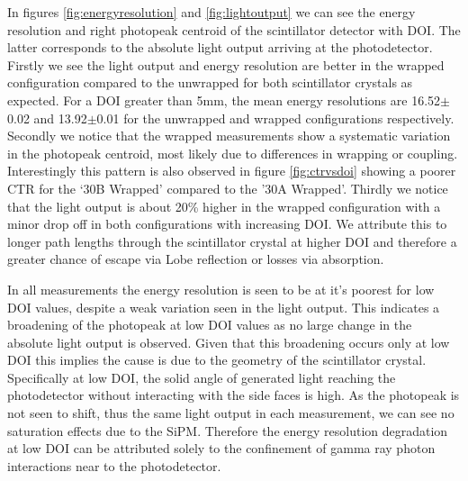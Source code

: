 In figures \ref{fig:energyresolution} and \ref{fig:lightoutput} we can see the energy resolution and right photopeak centroid of the scintillator detector with DOI. The latter corresponds to the absolute light output arriving at the photodetector. Firstly we see the light output and energy resolution are better in the wrapped configuration compared to the unwrapped for both scintillator crystals as expected. For a DOI greater than 5mm, the mean energy resolutions are 16.52$\pm$0.02 and 13.92$\pm$0.01 for the unwrapped and wrapped configurations respectively. Secondly we notice that the wrapped measurements show a systematic variation in the photopeak centroid, most likely due to differences in wrapping or coupling. Interestingly this pattern is also observed in figure \ref{fig:ctrvsdoi} showing a poorer CTR for the `30B Wrapped' compared to the '30A Wrapped'. Thirdly we notice that the light output is about 20\% higher in the wrapped configuration with a minor drop off in both configurations with increasing DOI. We attribute this to longer path lengths through the scintillator crystal at higher DOI and therefore a greater chance of escape via Lobe reflection\cite{Janecek_Moses_2010} or losses via absorption.

In all measurements the energy resolution is seen to be at it's poorest for low DOI values, despite a weak variation seen in the light output. This indicates a broadening of the photopeak at low DOI values as no large change in the absolute light output is observed. Given that this broadening occurs only at low DOI this implies the cause is due to the geometry of the scintillator crystal. Specifically at low DOI, the solid angle of generated light reaching the photodetector without interacting with the side faces is high. As the photopeak is not seen to shift, thus the same light output in each measurement, we can see no saturation effects due to the SiPM. Therefore
the energy resolution degradation at low DOI can be attributed solely to the confinement of gamma ray photon interactions near to the photodetector.